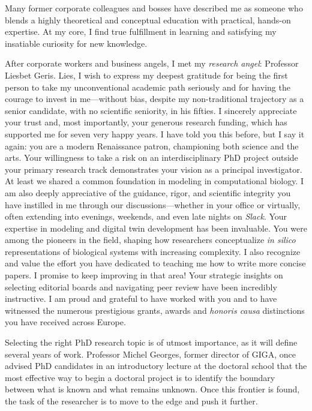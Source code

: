 Many former corporate colleagues and bosses have described me as someone who blends a highly theoretical and conceptual education with practical, hands-on expertise. At my core, I find true fulfillment in learning and satisfying my insatiable curiosity for new knowledge.

After corporate workers and business angels, I met my \textit{research angel}: Professor Liesbet Geris. Lies, I wish to express my deepest gratitude for being the first person to take my unconventional academic path seriously and for having the courage to invest in me—without bias, despite my non-traditional trajectory as a senior candidate, with no scientific seniority, in his fifties. I sincerely appreciate your trust and, most importantly, your generous research funding, which has supported me for seven very happy years. I have told you this before, but I say it again: you are a modern Renaissance patron, championing both science and the arts. Your willingness to take a risk on an interdisciplinary PhD project outside your primary research track demonstrates your vision as a principal investigator. At least we shared a common foundation in modeling in computational biology. I am also deeply appreciative of the guidance, rigor, and scientific integrity you have instilled in me through our discussions—whether in your office or virtually, often extending into evenings, weekends, and even late nights on \textit{Slack}. Your expertise in modeling and digital twin development has been invaluable. You were among the pioneers in the field, shaping how researchers conceptualize \textit{in silico} representations of biological systems with increasing complexity. I also recognize and value the effort you have dedicated to teaching me how to write more concise papers. I promise to keep improving in that area! Your strategic insights on selecting editorial boards and navigating peer review have been incredibly instructive. I am proud and grateful to have worked with you and to have witnessed the numerous prestigious grants, awards and \textit{honoris causa} distinctions you have received across Europe.

Selecting the right PhD research topic is of utmost importance, as it will define several years of work. Professor Michel Georges, former director of GIGA, once advised PhD candidates in an introductory lecture at the doctoral school that the most effective way to begin a doctoral project is to identify the boundary between what is known and what remains unknown. Once this frontier is found, the task of the researcher is to move to the edge and push it further.

